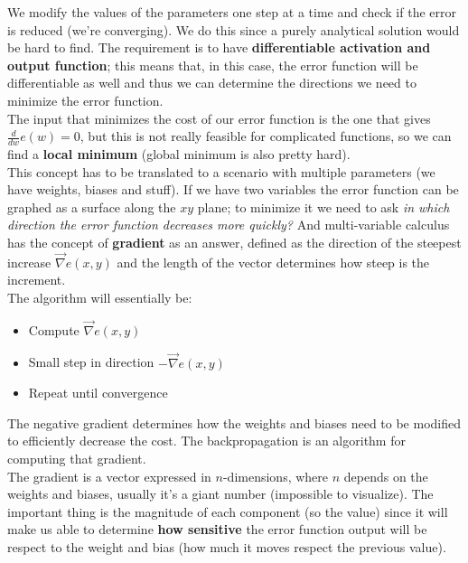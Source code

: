\documentclass[11pt]{article}
\begin{document}
		We modify the values of the parameters one step at a time and check if the error is reduced (we're converging). We do this since a purely analytical solution would be hard to find. The requirement is to have \textbf{differentiable activation and output function}; this means that, in this case, the error function will be differentiable as well and thus we can determine the directions we need to minimize the error function.\\
		
		The input that minimizes the cost of our error function is the one that gives $\frac{d}{dw} e(w) = 0$, but this is not really feasible for complicated functions, so we can find a \textbf{local minimum} (global minimum is also pretty hard).\\
		
		This concept has to be translated to a scenario with multiple parameters (we have weights, biases and stuff). If we have two variables the error function can be graphed as a surface along the $xy$ plane; to minimize it we need to ask \textit{in which direction the error function decreases more quickly?} And multi-variable calculus has the concept of \textbf{gradient} as an answer, defined as the direction of the steepest increase $\vec{\nabla} e(x,y)$ and the length of the vector determines how steep is the increment.\\
		
		The algorithm will essentially be: 
		\begin{itemize}
			\item Compute $\vec{\nabla} e(x,y)$
			\item Small step in direction $- \vec{\nabla} e(x,y)$
			\item Repeat until convergence
		\end{itemize}
		The negative gradient determines how the weights and biases need to be modified to efficiently decrease the cost. The backpropagation is an algorithm for computing that gradient.\\
		
		The gradient is a vector expressed in $n$-dimensions, where $n$ depends on the weights and biases, usually it's a giant number (impossible to visualize). The important thing is the magnitude of each component (so the value) since it will make us able to determine \textbf{how sensitive} the error function output will be respect to the weight and bias (how much it moves respect the previous value). \\
		
\end{document}
